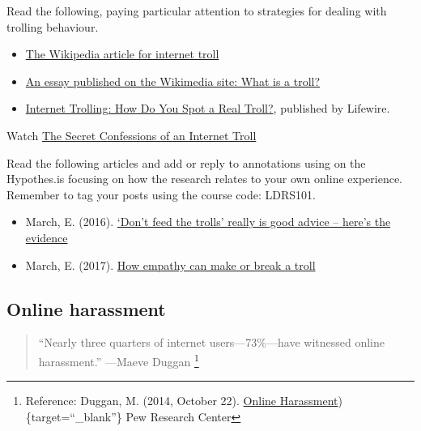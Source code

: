 \documentclass[
]{book}
\providecommand{\tightlist}{%
  \setlength{\itemsep}{0pt}\setlength{\parskip}{0pt}}
\theoremstyle{definition}
\theoremstyle{definition}
\theoremstyle{definition}
\theoremstyle{definition}
\theoremstyle{remark}
\begin{document}
\begin{reflect}
Read the following, paying particular attention to strategies for dealing with trolling behaviour.

\begin{itemize}
\tightlist
\item
  \href{https://en.wikipedia.org/wiki/Troll_(slang)}{The Wikipedia article for internet troll}\\
\item
  \href{https://meta.wikimedia.org/wiki/What_is_a_troll\%3F}{An essay published on the Wikimedia site: What is a troll?}\\
\item
  \href{https://www.lifewire.com/what-is-internet-trolling-3485891}{Internet Trolling: How Do You Spot a Real Troll?}, published by Lifewire.
\end{itemize}

Watch \href{https://www.youtube.com/watch?v=5BQp3V_34BE}{The Secret Confessions of an Internet Troll}

Read the following articles and add or reply to annotations using on the Hypothes.is focusing on how the research relates to your own online experience. Remember to tag your posts using the course code: LDRS101.

\begin{itemize}
\tightlist
\item
  March, E. (2016). \href{https://theconversation.com/dont-feed-the-trolls-really-is-good-advice-heres-the-evidence-63657}{`Don't feed the trolls' really is good advice -- here's the evidence}
\item
  March, E. (2017). \href{https://theconversation.com/how-empathy-can-make-or-break-a-troll-80680}{How empathy can make or break a troll}
\end{itemize}
\end{reflect}

\hypertarget{online-harassment}{%
\subsection*{Online harassment}\label{online-harassment}}

\begin{quote}
``Nearly three quarters of internet users---73\%---have witnessed online harassment.''
---Maeve Duggan \footnote{Reference: Duggan, M. (2014, October 22). \href{https://www.pewresearch.org/internet/2014/10/22/online-harassment/}{Online Harassment})\{target=``\_blank''\} Pew Research Center}
\end{quote}
\end{document}
